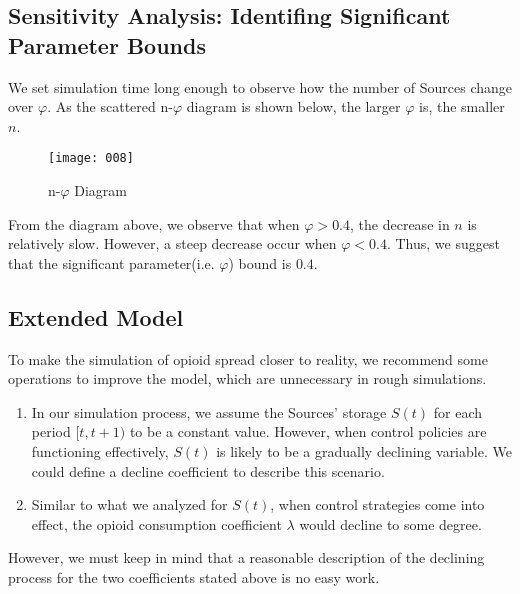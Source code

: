 	


\subsection{Sensitivity Analysis: Identifing Significant Parameter Bounds}

We set simulation time long enough to observe how the number of Sources 
change over $\varphi$. As the scattered n-$\varphi$ diagram is shown below, the larger $\varphi$ is, the smaller $n$.

\begin{figure}[H]
	\centering
	\texttt{[image: 008]}
	\caption{n-$\varphi$ Diagram}
\end{figure}

From the diagram above, we observe that when $\varphi > 0.4$, the decrease in $n$ is relatively slow. However, a steep decrease occur when $\varphi < 0.4$. Thus, we suggest that the significant parameter(i.e. $\varphi$) bound is $0.4$.

\subsection{Extended Model}
To make the simulation of opioid spread closer to reality, we recommend some operations to improve the model, which are unnecessary in rough simulations.
\begin{enumerate}
	\item In our simulation process, we assume the Sources' storage $S(t)$ for each period $[t,t+1)$ to be a constant value. However, when control policies are functioning effectively, $S(t)$ is likely to be a gradually declining variable. We could define a decline coefficient to describe this scenario.
	
	\item Similar to what we analyzed for $S(t)$, when control strategies come into effect, the opioid consumption coefficient $\lambda$ would decline to some degree.
\end{enumerate}

However, we must keep in mind that a reasonable description of the declining process for the two coefficients stated above is no easy work.
